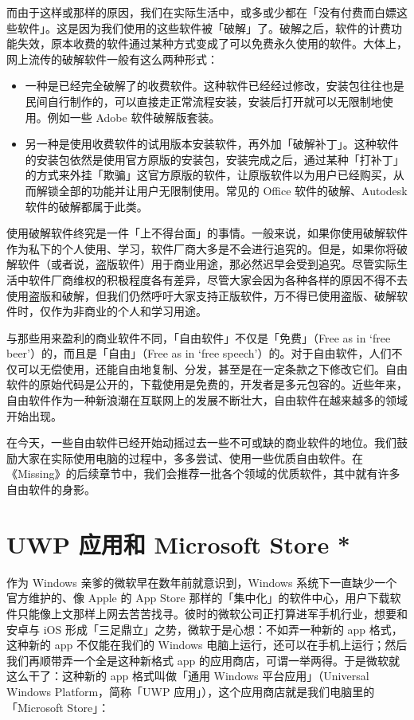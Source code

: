 而由于这样或那样的原因，我们在实际生活中，或多或少都在「没有付费而白嫖这些软件」。这是因为我们使用的这些软件被「破解」了。破解之后，软件的计费功能失效，原本收费的软件通过某种方式变成了可以免费永久使用的软件。大体上，网上流传的破解软件一般有这么两种形式：

\begin{itemize}
  \item 一种是已经完全破解了的收费软件。这种软件已经经过修改，安装包往往也是民间自行制作的，可以直接走正常流程安装，安装后打开就可以无限制地使用。例如一些 Adobe 软件破解版套装。
  \item 另一种是使用收费软件的试用版本安装软件，再外加「破解补丁」。这种软件的安装包依然是使用官方原版的安装包，安装完成之后，通过某种「打补丁」的方式来外挂「欺骗」这官方原版的软件，让原版软件以为用户已经购买，从而解锁全部的功能并让用户无限制使用。常见的 Office 软件的破解、Autodesk 软件的破解都属于此类。
\end{itemize}

使用破解软件终究是一件「上不得台面」的事情。一般来说，如果你使用破解软件作为私下的个人使用、学习，软件厂商大多是不会进行追究的。但是，如果你将破解软件（或者说，盗版软件）用于商业用途，那必然迟早会受到追究。尽管实际生活中软件厂商维权的积极程度各有差异，尽管大家会因为各种各样的原因不得不去使用盗版和破解，但我们仍然呼吁大家支持正版软件，万不得已使用盗版、破解软件时，仅作为非商业的个人和学习用途。

与那些用来盈利的商业软件不同，「自由软件」不仅是「免费」（Free as in `free beer'）的，而且是「自由」（Free as in `free speech'）的。对于自由软件，人们不仅可以无偿使用，还能自由地复制、分发，甚至是在一定条款之下修改它们。自由软件的原始代码是公开的，下载使用是免费的，开发者是多元包容的。近些年来，自由软件作为一种新浪潮在互联网上的发展不断壮大，自由软件在越来越多的领域开始出现。

在今天，一些自由软件已经开始动摇过去一些不可或缺的商业软件的地位。我们鼓励大家在实际使用电脑的过程中，多多尝试、使用一些优质自由软件。在《Missing》的后续章节中，我们会推荐一批各个领域的优质软件，其中就有许多自由软件的身影。

\section{UWP 应用和 Microsoft Store *}

作为 Windows 亲爹的微软早在数年前就意识到，Windows 系统下一直缺少一个官方维护的、像 Apple 的 App Store 那样的「集中化」的软件中心，用户下载软件只能像上文那样上网去苦苦找寻。彼时的微软公司正打算进军手机行业，想要和安卓与 iOS 形成「三足鼎立」之势，微软于是心想：不如弄一种新的 app 格式，这种新的 app 不仅能在我们的 Windows 电脑上运行，还可以在手机上运行；然后我们再顺带弄一个全是这种新格式 app 的应用商店，可谓一举两得。于是微软就这么干了：这种新的 app 格式叫做「通用 Windows 平台应用」（Universal Windows Platform，简称「UWP 应用」），这个应用商店就是我们电脑里的「Microsoft Store」：

